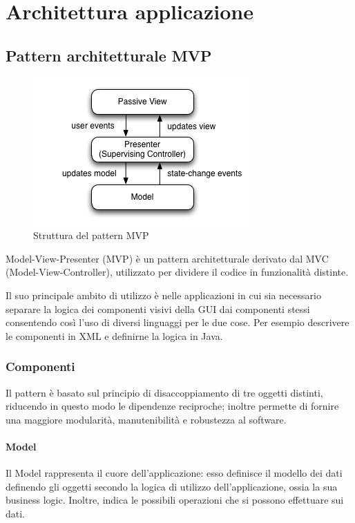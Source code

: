 \documentclass[../ManualeSviluppatore.tex]{subfiles}
\begin{document}
\section{Architettura applicazione}

	\subsection{Pattern architetturale MVP}
	\begin{figure}[!h]
		\centering
		\includegraphics[scale=0.6]{img/mvp}
			\caption{Struttura del pattern MVP}
		\label{fig:StrutturaMVP}
	\end{figure}
	
			Model-View-Presenter (MVP) è un pattern architetturale derivato dal MVC (Model-View-Controller), utilizzato per dividere il codice in funzionalità distinte. 
			
			Il suo principale ambito di utilizzo è nelle applicazioni in cui sia necessario separare la logica dei componenti visivi della GUI dai componenti stessi consentendo così l'uso di diversi linguaggi per le due cose. Per esempio  descrivere le componenti in XML e definirne la logica in Java.
			
			\subsubsection{Componenti}
			Il pattern è basato sul principio di disaccoppiamento di tre oggetti distinti, riducendo in questo modo le dipendenze reciproche; inoltre permette di fornire una maggiore modularità, manutenibilità e robustezza al software.
				\paragraph*{Model}
					Il Model rappresenta il cuore dell'applicazione: esso definisce il modello dei dati definendo gli oggetti secondo la logica di utilizzo dell'applicazione, ossia la sua business logic. Inoltre, indica le possibili operazioni che si possono effettuare sui dati.
					
\end{document}
